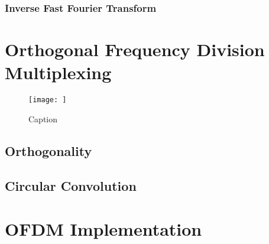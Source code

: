 \documentclass{article}
\begin{document}
\subsubsection{Inverse Fast Fourier Transform}

\section{Orthogonal Frequency Division Multiplexing}

\begin{figure}
    \centering
    \texttt{[image: ]}
    \caption{Caption}
    \label{fig:OFDM_Block_Diagram}
\end{figure}

\subsection{Orthogonality}

\subsection{Circular Convolution}


\section{OFDM Implementation}




\printbibliography
\end{document}
